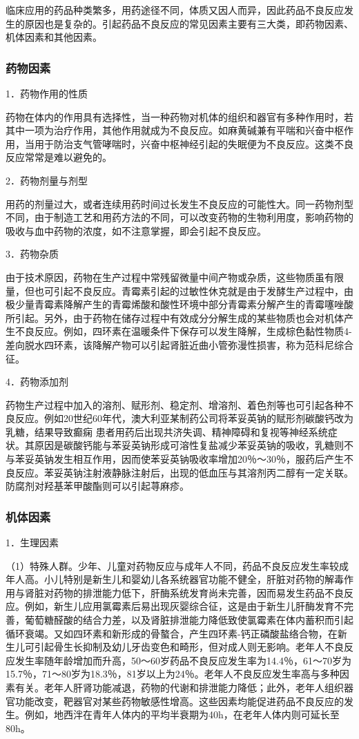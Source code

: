 临床应用的药品种类繁多，用药途径不同，体质又因人而异，因此药品不良反应发生的原因也是复杂的。引起药品不良反应的常见因素主要有三大类，即药物因素、机体因素和其他因素。

\subsubsection{药物因素}

1．药物作用的性质

药物在体内的作用具有选择性，当一种药物对机体的组织和器官有多种作用时，若其中一项为治疗作用，其他作用就成为不良反应。如麻黄碱兼有平喘和兴奋中枢作用，当用于防治支气管哮喘时，兴奋中枢神经引起的失眠便为不良反应。这类不良反应常常是难以避免的。

2．药物剂量与剂型

用药的剂量过大，或者连续用药时间过长发生不良反应的可能性大。同一药物剂型不同，由于制造工艺和用药方法的不同，可以改变药物的生物利用度，影响药物的吸收与血中药物的浓度，如不注意掌握，即会引起不良反应。

3．药物杂质

由于技术原因，药物在生产过程中常残留微量中间产物或杂质，这些物质虽有限量，但也可引起不良反应。青霉素引起的过敏性休克就是由于发酵生产过程中，由极少量青霉素降解产生的青霉烯酸和酸性环境中部分青霉素分解产生的青霉噻唑酸所引起。另外，由于药物在储存过程中有效成分分解生成的某些物质也会对机体产生不良反应。例如，四环素在温暖条件下保存可以发生降解，生成棕色黏性物质4-差向脱水四环素，该降解产物可以引起肾脏近曲小管弥漫性损害，称为范科尼综合征。

4．药物添加剂

药物生产过程中加入的溶剂、赋形剂、稳定剂、增溶剂、着色剂等也可引起各种不良反应。例如20世纪60年代，澳大利亚某制药公司将苯妥英钠的赋形剂碳酸钙改为乳糖，结果导致癫痫
患者用药后出现共济失调、精神障碍和复视等神经系统症状。其原因是碳酸钙能与苯妥英钠形成可溶性复盐减少苯妥英钠的吸收，乳糖则不与苯妥英钠发生相互作用，因而使苯妥英钠吸收率增加20％～30％，服药后产生不良反应。苯妥英钠注射液静脉注射后，出现的低血压与其溶剂丙二醇有一定关联。防腐剂对羟基苯甲酸酯则可以引起荨麻疹。

\subsubsection{机体因素}

1．生理因素

（1）特殊人群。少年、儿童对药物反应与成年人不同，药品不良反应发生率较成年人高。小儿特别是新生儿和婴幼儿各系统器官功能不健全，肝脏对药物的解毒作用与肾脏对药物的排泄能力低下，肝酶系统发育尚未完善，因而易发生药品不良反应。例如，新生儿应用氯霉素后易出现灰婴综合征，这是由于新生儿肝酶发育不完善，葡萄糖醛酸的结合力差，以及肾脏排泄能力降低致使氯霉素在体内蓄积而引起循环衰竭。又如四环素和新形成的骨螯合，产生四环素-钙正磷酸盐络合物，在新生儿可引起骨生长抑制及幼儿牙齿变色和畸形，但对成人则无影响。老年人不良反应发生率随年龄增加而升高，50～60岁药品不良反应发生率为14.4％，61～70岁为15.7％，71～80岁为18.3％，81岁以上为24％。老年人不良反应发生率高与多种因素有关。老年人肝肾功能减退，药物的代谢和排泄能力降低；此外，老年人组织器官功能改变，靶器官对某些药物敏感性增高。这些因素均能促进药品不良反应的发生。例如，地西泮在青年人体内的平均半衰期为40h，在老年人体内则可延长至80h。

